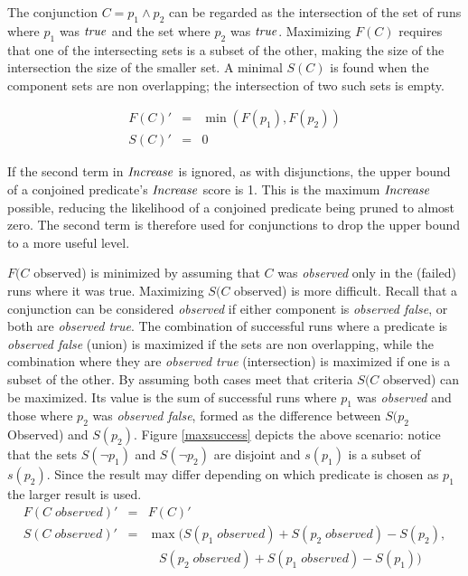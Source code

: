 The conjunction $C = p_1 \wedge p_2$ can be regarded as the intersection of the set of runs where $p_1$ was $\mathit{true}$ and the set where $p_2$ was $\mathit{true}$.  Maximizing $F(C)$ requires that one of the intersecting sets is a subset of the other, making the size of the intersection the size of the smaller set.  A minimal $S(C)$ is found when the component sets are non overlapping; the intersection of two such sets is empty.

\begin{eqnarray*}
  F(C)' &=&  \min(F(p_1),F(p_2)) \\
  S(C)' &=& 0
\end{eqnarray*}

If the second term in $\mathit{Increase}$ is ignored, as with disjunctions, the upper bound of a conjoined predicate's $\mathit{Increase}$ score is 1.  This is the maximum $\mathit{Increase}$ possible, reducing the likelihood of a conjoined predicate being pruned to almost zero.  The second term is therefore used for conjunctions to drop the upper bound to a more useful level.

$F(C$ observed) is minimized by assuming that $C$ was \textit{observed} only in the (failed) runs where it was true.  Maximizing $S(C$ observed) is more difficult.  Recall that a conjunction can be considered \textit{observed} if either component is \textit{observed false}, or both are \textit{observed true}.  The combination of successful runs where a predicate is \textit{observed false} (union) is maximized if the sets are non overlapping, while the combination where they are \textit{observed true} (intersection) is maximized if one is a subset of the other.  By assuming both cases meet that criteria $S(C$ observed) can be maximized.  Its value is the sum of successful runs where $p_1$ was \textit{observed} and those where $p_2$ was \textit{observed false}, formed as the difference between $S(p_2$  Observed) and $S(p_2)$. Figure \ref{maxsuccess} depicts the above scenario: notice that the sets $S(\neg p_1)$ and $S(\neg p_2)$ are disjoint and $s(p_1)$ is a subset of $s(p_2)$.  Since the result may differ depending on which predicate is chosen as $p_1$ the larger result is used.
\begin{eqnarray*}
  F(C\;observed)' &=& F(C)' \\
  S(C\;observed)' &=&
  \max(S(p_1\;observed)+S(p_2\;observed)-S(p_2),\\
  & &\ \ \ \ S(p_2\;observed)+S(p_1\;observed)-S(p_1))
\end{eqnarray*}

